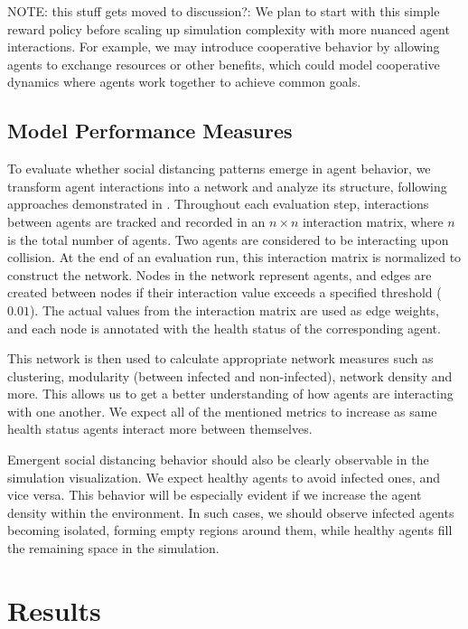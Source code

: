 \documentclass[9pt]{IEEEtran}
\begin{document}
NOTE: this stuff gets moved to discussion?: We plan to start with this simple reward policy before scaling up simulation complexity with more nuanced agent interactions. For example, we may introduce cooperative behavior by allowing agents to exchange resources or other benefits, which could model cooperative dynamics where agents work together to achieve common goals.

\subsection{Model Performance Measures}

To evaluate whether social distancing patterns emerge in agent behavior, we transform agent interactions into a network and analyze its structure, following approaches demonstrated in \cite{Stroeymeyt2018}. Throughout each evaluation step, interactions between agents are tracked and recorded in an $n \times n$ interaction matrix, where $n$ is the total number of agents. Two agents are considered to be interacting upon collision. At the end of an evaluation run, this interaction matrix is normalized to construct the network. Nodes in the network represent agents, and edges are created between nodes if their interaction value exceeds a specified threshold ($0.01$). The actual values from the interaction matrix are used as edge weights, and each node is annotated with the health status of the corresponding agent.

This network is then used to calculate appropriate network measures such as clustering, modularity (between infected and non-infected), network density and more. This allows us to get a better understanding of how agents are interacting with one another. We expect all of the mentioned metrics to increase as same health status agents interact more between themselves.

Emergent social distancing behavior should also be clearly observable in the simulation visualization. We expect healthy agents to avoid infected ones, and vice versa. This behavior will be especially evident if we increase the agent density within the environment. In such cases, we should observe infected agents becoming isolated, forming empty regions around them, while healthy agents fill the remaining space in the simulation.

\section{Results}
\end{document}
